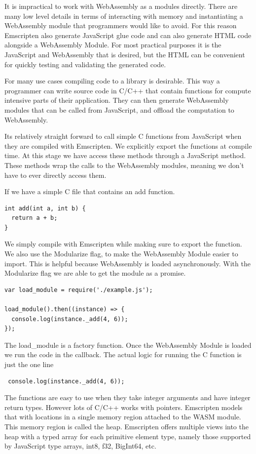 \documentclass[11pt]{book}
\begin{document}
It is impractical to work with WebAssembly as a modules directly. There are many low level details in terms of interacting with memory and instantiating a WebAssembly module that programmers would like to avoid. For this reason Emscripten also generate JavaScript glue code and can also generate HTML code alongside a WebAssembly Module. For most practical purposes it is the JavaScript and WebAssembly that is desired, but the HTML can be convenient for quickly testing and validating the generated code. 

For many use cases compiling code to a library is desirable. This way a programmer can write source code in C/C++ that contain functions for compute intensive parts of their application. They can then generate WebAssembly modules that can be called from JavaScript, and offload the computation to WebAssembly. 

Its relatively straight forward to call simple C functions from JavaScript when they are compiled with Emscripten. We explicitly export the functions at compile time. At this stage we have access these methods through a JavaScript method. These methods wrap the calls to the WebAssembly modules, meaning we don't have to ever directly access them.

If we have a simple C file that contains an add function.
\begin{verbatim}
int add(int a, int b) {
  return a + b;
}
\end{verbatim}
We simply compile with Emscripten while making sure to export the function. We also use the Modularize flag, to make the WebAssembly Module easier to import. This is helpful because WebAssembly is loaded asynchronously. With the Modularize flag we are able to get the module as a promise.

\begin{verbatim}
var load_module = require('./example.js');

load_module().then((instance) => {
  console.log(instance._add(4, 6));
});
\end{verbatim}

The load\_module is a factory function. Once the WebAssembly Module is loaded we run the code in the callback. The actual logic for running the C function is just the one line
\begin{verbatim}
 console.log(instance._add(4, 6));
\end{verbatim}

The functions are easy to use when they take integer arguments and have integer return types. However lots of C/C++ works with pointers. Emscripten models that with locations in a single memory region attached to the WASM module. This memory region is called the heap. Emscripten offers multiple views into the heap with a typed array for each primitive element type, namely those supported by JavaScript type arrays, int8, f32, BigInt64, etc.
\end{document}
